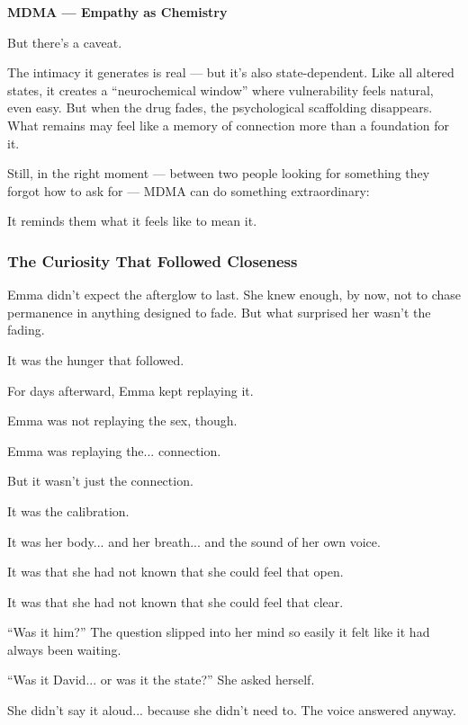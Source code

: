 \begin{TechnicalSidebar}{\textbf{MDMA — Empathy as Chemistry}}
  \medskip
  
  But there’s a caveat.

  \medskip
  
  The intimacy it generates is real — but it’s also state-dependent. Like all altered states, it 
  creates a “neurochemical window” where vulnerability feels natural, even easy. But when the drug 
  fades, the psychological scaffolding disappears. What remains may feel like a memory of connection 
  more than a foundation for it.
  
  \medskip
  
  Still, in the right moment — between two people looking for something they forgot how to ask for — 
  MDMA can do something extraordinary:
  
  \medskip
  
  It reminds them what it feels like to mean it.
  
\end{TechnicalSidebar}


\subsubsection{The Curiosity That Followed Closeness}

Emma didn’t expect the afterglow to last. She knew enough, by now, not to chase permanence in anything 
designed to fade. But what surprised her wasn’t the fading.

It was the hunger that followed.

For days afterward, Emma kept replaying it.  

Emma was not replaying the sex, though. 

Emma was replaying the... connection.

But it wasn’t just the connection. 

It was the calibration. 

It was her body... and her breath... and the sound of her own voice.

It was that she had not known that she could feel that open. 

It was that she had not known that she could feel that clear.

``Was it him?'' The question slipped into her mind so easily it felt like it had always been waiting. 

``Was it David... or was it the state?'' She asked herself. 

She didn’t say it aloud... because she didn’t need to. The voice answered anyway.

